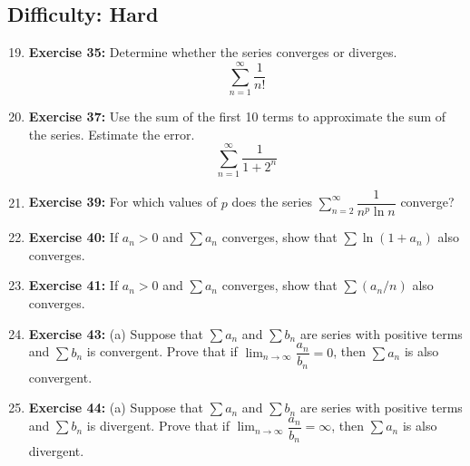 \documentclass[12pt, a4paper]{article}
\begin{document}
\subsection*{Difficulty: Hard}
\begin{enumerate}
    \setcounter{enumi}{18}
    \item \textbf{Exercise 35:} Determine whether the series converges or diverges.
    \[ \sum_{n=1}^{\infty} \dfrac{1}{n!} \]
    
    \item \textbf{Exercise 37:} Use the sum of the first 10 terms to approximate the sum of the series. Estimate the error.
    \[ \sum_{n=1}^{\infty} \dfrac{1}{1 + 2^n} \]

    \item \textbf{Exercise 39:} For which values of $p$ does the series $\sum_{n=2}^{\infty} \dfrac{1}{n^p \ln n}$ converge?
    
    \item \textbf{Exercise 40:} If $a_n > 0$ and $\sum a_n$ converges, show that $\sum \ln(1+a_n)$ also converges.

    \item \textbf{Exercise 41:} If $a_n > 0$ and $\sum a_n$ converges, show that $\sum (a_n / n)$ also converges.

    \item \textbf{Exercise 43:} (a) Suppose that $\sum a_n$ and $\sum b_n$ are series with positive terms and $\sum b_n$ is convergent. Prove that if $\lim_{n \to \infty} \dfrac{a_n}{b_n} = 0$, then $\sum a_n$ is also convergent.
    
    \item \textbf{Exercise 44:} (a) Suppose that $\sum a_n$ and $\sum b_n$ are series with positive terms and $\sum b_n$ is divergent. Prove that if $\lim_{n \to \infty} \dfrac{a_n}{b_n} = \infty$, then $\sum a_n$ is also divergent.
\end{enumerate}
\end{document}
